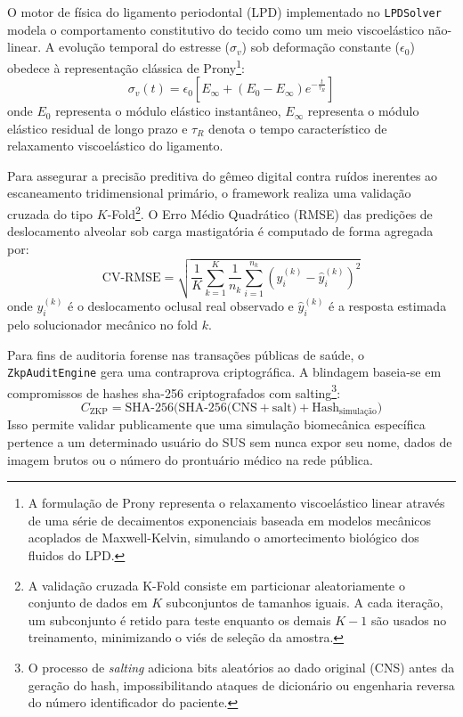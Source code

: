 O motor de física do ligamento periodontal (LPD) implementado no \texttt{LPDSolver} modela o comportamento constitutivo do tecido como um meio viscoelástico não-linear. A evolução temporal do estresse ($\sigma_v$) sob deformação constante ($\epsilon_0$) obedece à representação clássica de Prony\footnote{A formulação de Prony representa o relaxamento viscoelástico linear através de uma série de decaimentos exponenciais baseada em modelos mecânicos acoplados de Maxwell-Kelvin, simulando o amortecimento biológico dos fluidos do LPD.}:
\begin{equation}
    \sigma_v(t) = \epsilon_0 \left[ E_{\infty} + (E_0 - E_{\infty}) e^{-\frac{t}{\tau_R}} \right]
\end{equation}
onde $E_0$ representa o módulo elástico instantâneo, $E_{\infty}$ representa o módulo elástico residual de longo prazo e $\tau_R$ denota o tempo característico de relaxamento viscoelástico do ligamento.

Para assegurar a precisão preditiva do gêmeo digital contra ruídos inerentes ao escaneamento tridimensional primário, o framework realiza uma validação cruzada do tipo $K$-Fold\footnote{A validação cruzada K-Fold consiste em particionar aleatoriamente o conjunto de dados em $K$ subconjuntos de tamanhos iguais. A cada iteração, um subconjunto é retido para teste enquanto os demais $K-1$ são usados no treinamento, minimizando o viés de seleção da amostra.}. O Erro Médio Quadrático (RMSE) das predições de deslocamento alveolar sob carga mastigatória é computado de forma agregada por:
\begin{equation}
    \text{CV-RMSE} = \sqrt{\frac{1}{K} \sum_{k=1}^K \frac{1}{n_k} \sum_{i=1}^{n_k} \left( y_i^{(k)} - \hat{y}_i^{(k)} \right)^2}
\end{equation}
onde $y_i^{(k)}$ é o deslocamento oclusal real observado e $\hat{y}_i^{(k)}$ é a resposta estimada pelo solucionador mecânico no fold $k$.

Para fins de auditoria forense nas transações públicas de saúde, o \texttt{ZkpAuditEngine} gera uma contraprova criptográfica. A blindagem baseia-se em compromissos de hashes sha-256 criptografados com salting\footnote{O processo de \textit{salting} adiciona bits aleatórios ao dado original (CNS) antes da geração do hash, impossibilitando ataques de dicionário ou engenharia reversa do número identificador do paciente.}:
\begin{equation}
    C_{\text{ZKP}} = \text{SHA-256}\Big(\text{SHA-256}\big(\text{CNS} + \text{salt}\big) + \text{Hash}_{\text{simulação}}\Big)
\end{equation}
Isso permite validar publicamente que uma simulação biomecânica específica pertence a um determinado usuário do SUS sem nunca expor seu nome, dados de imagem brutos ou o número do prontuário médico na rede pública.

